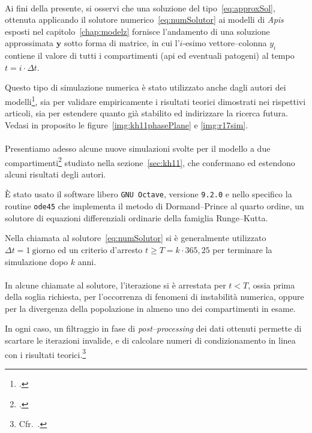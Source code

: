 \paragraph{}
Ai fini della presente, si osservi che una soluzione del tipo~\eqref{eq:approxSol}, ottenuta applicando il solutore
numerico~\eqref{eq:numSolutor} ai modelli di \emph{Apis} esposti nel capitolo~\ref{chap:modelz} fornisce l'andamento
di una soluzione approssimata $\mathbf{y}$ sotto forma di matrice, in cui l'$i$-esimo
vettore--colonna $y_i$ contiene il valore di
tutti i compartimenti (api ed eventuali patogeni) al tempo $t = i \cdot \Delta t$.

Questo tipo di simulazione numerica è stato utilizzato anche dagli autori dei modelli\footcite{khoury2011,ratti2017},
sia per validare empiricamente i risultati teorici dimostrati nei rispettivi articoli, sia per estendere
quanto già stabilito ed indirizzare la ricerca futura. Vedasi in proposito le figure~\ref{img:kh11phasePlane} e
\ref{img:r17sim}.

\paragraph{}
Presentiamo adesso alcune nuove simulazioni svolte per il modello a due compartimenti\footcite{khoury2011}
studiato nella sezione~\ref{sec:kh11}, che confermano ed estendono alcuni risultati degli autori.

È stato usato il software libero \texttt{GNU Octave}, versione \texttt{9.2.0} e nello specifico
la routine \texttt{ode45} che implementa il metodo di Dormand--Prince al quarto ordine, un solutore
di equazioni differenziali ordinarie della famiglia Runge--Kutta.

Nella chiamata al solutore~\eqref{eq:numSolutor} si è generalmente utilizzato $\Delta t=1~\text{giorno}$
ed un criterio d'arresto $t \geq T=k \cdot 365,25$ per terminare la simulazione dopo $k$ anni.

\paragraph{}
In alcune chiamate al solutore, l'iterazione si è arrestata per $t < T$, ossia prima della soglia richiesta, per
l'occorrenza di fenomeni di instabilità numerica, oppure per la divergenza della popolazione in almeno
uno dei compartimenti in esame.

In ogni caso, un filtraggio in fase di \emph{post--processing} dei dati ottenuti permette di scartare le iterazioni
invalide, e di calcolare numeri di condizionamento in linea con i risultati teorici.\footnote{Cfr.~\cite{demmel}.}






